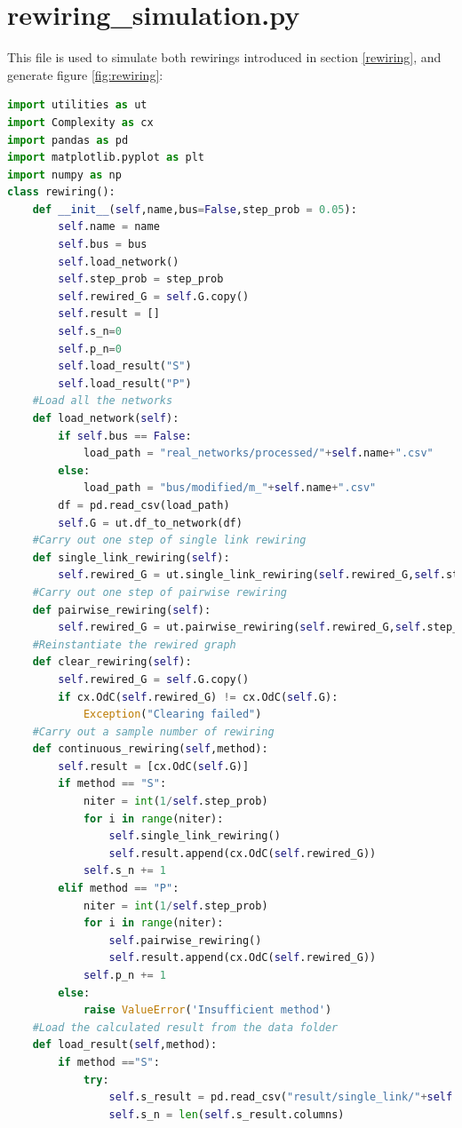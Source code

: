 \documentclass[12pt]{article}
\begin{document}
\section{rewiring\_simulation.py}
This file is used to simulate both rewirings introduced in section \ref{rewiring}, and generate figure \ref{fig:rewiring}:
\begin{lstlisting}[breaklines=true,language=Python]
import utilities as ut
import Complexity as cx
import pandas as pd
import matplotlib.pyplot as plt
import numpy as np
class rewiring():
    def __init__(self,name,bus=False,step_prob = 0.05):
        self.name = name
        self.bus = bus
        self.load_network()
        self.step_prob = step_prob
        self.rewired_G = self.G.copy()
        self.result = []
        self.s_n=0
        self.p_n=0
        self.load_result("S")
        self.load_result("P")
    #Load all the networks
    def load_network(self):
        if self.bus == False:
            load_path = "real_networks/processed/"+self.name+".csv"
        else:
            load_path = "bus/modified/m_"+self.name+".csv"
        df = pd.read_csv(load_path)
        self.G = ut.df_to_network(df)
    #Carry out one step of single link rewiring
    def single_link_rewiring(self):
        self.rewired_G = ut.single_link_rewiring(self.rewired_G,self.step_prob)
    #Carry out one step of pairwise rewiring
    def pairwise_rewiring(self):
        self.rewired_G = ut.pairwise_rewiring(self.rewired_G,self.step_prob)
    #Reinstantiate the rewired graph
    def clear_rewiring(self):
        self.rewired_G = self.G.copy()
        if cx.OdC(self.rewired_G) != cx.OdC(self.G):
            Exception("Clearing failed")
    #Carry out a sample number of rewiring
    def continuous_rewiring(self,method):
        self.result = [cx.OdC(self.G)]
        if method == "S":
            niter = int(1/self.step_prob)
            for i in range(niter):
                self.single_link_rewiring()
                self.result.append(cx.OdC(self.rewired_G))
            self.s_n += 1
        elif method == "P":
            niter = int(1/self.step_prob)
            for i in range(niter):
                self.pairwise_rewiring()
                self.result.append(cx.OdC(self.rewired_G))
            self.p_n += 1
        else:
            raise ValueError('Insufficient method')
    #Load the calculated result from the data folder
    def load_result(self,method):
        if method =="S":
            try:
                self.s_result = pd.read_csv("result/single_link/"+self.name+".csv")
                self.s_n = len(self.s_result.columns)

\end{lstlisting}
\end{document}
